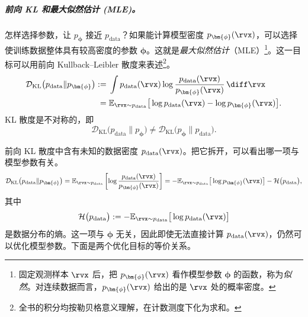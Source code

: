 \subparagraph{前向 KL 和最大似然估计 (MLE)。}
怎样选择参数，让 $p_{\bm{\phi}}$ 接近 $p_{\mathrm{data}}$？如果能计算模型密度 $p_{\bm{\phi}}(\rvx)$，可以选择使训练数据整体具有较高密度的参数 $\bm{\phi}$。这就是\emph{最大似然估计}（MLE）\footnote{固定观测样本 $\rvx$ 后，把 $p_{\bm{\phi}}(\rvx)$ 看作模型参数 $\bm{\phi}$ 的函数，称为\emph{似然}。对连续数据而言，$p_{\bm{\phi}}(\rvx)$ 给出的是 $\rvx$ 处的概率密度。}。这一目标可以用前向 Kullback--Leibler 散度来表述\footnote{全书的积分均按勒贝格意义理解，在计数测度下化为求和。}。
\begin{align*}
\mathcal{D}_{\mathrm{KL}}
\big(p_{\mathrm{data}}\|p_{\bm{\phi}}\big)
:=\;&
\int
p_{\mathrm{data}}(\rvx)
\log
\frac{p_{\mathrm{data}}(\rvx)}
     {p_{\bm{\phi}}(\rvx)}
\,\diff \rvx
\\
=\;&
\mathbb{E}_{\rvx\sim p_{\mathrm{data}}}
\big[
\log p_{\mathrm{data}}(\rvx)
-
\log p_{\bm{\phi}}(\rvx)
\big].
\end{align*}
KL 散度是不对称的，即
\[
\mathcal{D}_{\mathrm{KL}}
\big(p_{\mathrm{data}}\|p_{\bm{\phi}}\big)
\neq
\mathcal{D}_{\mathrm{KL}}
\big(p_{\bm{\phi}}\|p_{\mathrm{data}}\big).
\]

前向 KL 散度中含有未知的数据密度 $p_{\mathrm{data}}(\rvx)$。把它拆开，可以看出哪一项与模型参数有关。
\begin{align*}
\mathcal{D}_{\mathrm{KL}}
\big(p_{\mathrm{data}}\|p_{\bm{\phi}}\big)
=
\mathbb{E}_{\rvx\sim p_{\mathrm{data}}}
\left[
\log
\frac{p_{\mathrm{data}}(\rvx)}
     {p_{\bm{\phi}}(\rvx)}
\right]
=
-\mathbb{E}_{\rvx\sim p_{\mathrm{data}}}
\big[
\log p_{\bm{\phi}}(\rvx)
\big]
-
\mathcal{H}\big(p_{\mathrm{data}}\big),
\end{align*}
其中
\[
\mathcal{H}\big(p_{\mathrm{data}}\big)
:=
-\mathbb{E}_{\rvx\sim p_{\mathrm{data}}}
\big[
\log p_{\mathrm{data}}(\rvx)
\big]
\]
是数据分布的熵。这一项与 $\bm{\phi}$ 无关，因此即使无法直接计算 $p_{\mathrm{data}}(\rvx)$，仍然可以优化模型参数。下面是两个优化目标的等价关系。

